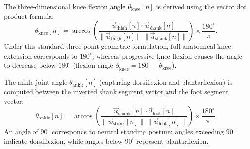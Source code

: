 \documentclass[12pt,a4paper]{article}
\begin{document}
The three-dimensional knee flexion angle $\theta_{\text{knee}}[n]$ is derived using the vector dot product formula:
\begin{equation}
\theta_{\text{knee}}[n] = \arccos\left( \frac{\vec{u}_{\text{thigh}}[n] \cdot \vec{u}_{\text{shank}}[n]}{\|\vec{u}_{\text{thigh}}[n]\|\,\|\vec{u}_{\text{shank}}[n]\|} \right) \times \frac{180^\circ}{\pi}.
\label{eq:knee-angle}
\end{equation}
Under this standard three-point geometric formulation, full anatomical knee extension corresponds to $180^\circ$, whereas progressive knee flexion causes the angle to decrease below $180^\circ$ (flexion angle $\phi_{\text{knee}} = 180^\circ - \theta_{\text{knee}}$).

The ankle joint angle $\theta_{\text{ankle}}[n]$ (capturing dorsiflexion and plantarflexion) is computed between the inverted shank segment vector and the foot segment vector:
\begin{equation}
\theta_{\text{ankle}}[n] = \arccos\left( \frac{\vec{w}_{\text{shank}}[n] \cdot \vec{u}_{\text{foot}}[n]}{\|\vec{w}_{\text{shank}}[n]\|\,\|\vec{u}_{\text{foot}}[n]\|} \right) \times \frac{180^\circ}{\pi}.
\label{eq:ankle-angle}
\end{equation}
An angle of $90^\circ$ corresponds to neutral standing posture; angles exceeding $90^\circ$ indicate dorsiflexion, while angles below $90^\circ$ represent plantarflexion.
\end{document}
